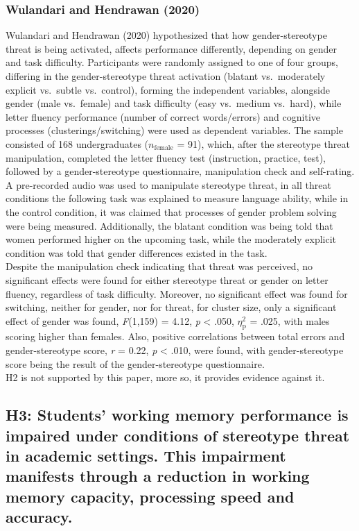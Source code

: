 \documentclass[
  stu,floatsintext]{apa7}
\begin{document}
\subsubsection{Wulandari and Hendrawan (2020)}\label{wulandaritrustyourabilities2020}

Wulandari and Hendrawan (2020) hypothesized that how gender-stereotype threat is being activated, affects performance differently, depending on gender and task difficulty.
Participants were randomly assigned to one of four groups, differing in the gender-stereotype threat activation (blatant vs.~moderately explicit vs.~subtle vs.~control), forming the independent variables, alongside gender (male vs.~female) and task difficulty (easy vs.~medium vs.~hard), while letter fluency performance (number of correct words/errors) and cognitive processes (clusterings/switching) were used as dependent variables.
The sample consisted of 168 undergraduates (\(n_{\text{female}}\) = 91), which, after the stereotype threat manipulation, completed the letter fluency test (instruction, practice, test), followed by a gender-stereotype questionnaire, manipulation check and self-rating.
A pre-recorded audio was used to manipulate stereotype threat, in all threat conditions the following task was explained to measure language ability, while in the control condition, it was claimed that processes of gender problem solving were being measured.
Additionally, the blatant condition was being told that women performed higher on the upcoming task, while the moderately explicit condition was told that gender differences existed in the task.\\
Despite the manipulation check indicating that threat was perceived, no significant effects were found for either stereotype threat or gender on letter fluency, regardless of task difficulty.
Moreover, no significant effect was found for switching, neither for gender, nor for threat, for cluster size, only a significant effect of gender was found, \emph{F}(1,159) = 4.12, \emph{p} \textless{} .050, \(\eta^{2}_{\text{p}}\) = .025, with males scoring higher than females.
Also, positive correlations between total errors and gender-stereotype score, \emph{r} = 0.22, \emph{p} \textless{} .010, were found, with gender-stereotype score being the result of the gender-stereotype questionnaire.\\
H2 is not supported by this paper, more so, it provides evidence against it.

\subsection{H3: Students' working memory performance is impaired under conditions of stereotype threat in academic settings. This impairment manifests through a reduction in working memory capacity, processing speed and accuracy.}\label{h3-students-working-memory-performance-is-impaired-under-conditions-of-stereotype-threat-in-academic-settings.-this-impairment-manifests-through-a-reduction-in-working-memory-capacity-processing-speed-and-accuracy.}
\end{document}
